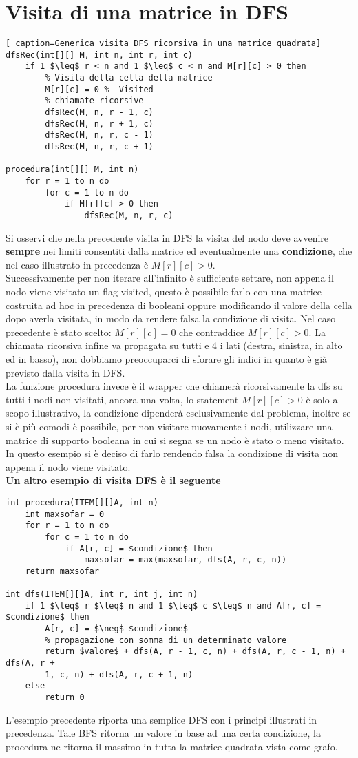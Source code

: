 \documentclass[../cheatSheetAlgoritmi.tex]{subfiles}
\begin{document}
\section{Visita di una matrice in DFS}
\begin{lstlisting}[ caption=Generica visita DFS ricorsiva in una matrice quadrata]
dfsRec(int[][] M, int n, int r, int c)
	if 1 $\leq$ r < n and 1 $\leq$ c < n and M[r][c] > 0 then
    	% Visita della cella della matrice
    	M[r][c] = 0	%  Visited
    	% chiamate ricorsive
    	dfsRec(M, n, r - 1, c)
    	dfsRec(M, n, r + 1, c)
    	dfsRec(M, n, r, c - 1)
    	dfsRec(M, n, r, c + 1)

procedura(int[][] M, int n)
	for r = 1 to n do
    	for c = 1 to n do
      		if M[r][c] > 0 then
        		dfsRec(M, n, r, c)
\end{lstlisting}
Si osservi che nella precedente visita in DFS la visita del nodo deve avvenire \textbf{sempre} nei limiti consentiti dalla matrice ed eventualmente una \textbf{condizione}, che nel caso illustrato in precedenza è $M[r][c] > 0$. \\
Successivamente per non iterare all'infinito è sufficiente settare, non appena il nodo viene visitato un flag visited, questo è possibile farlo con una matrice costruita ad hoc in precedenza di booleani oppure modificando il valore della cella dopo averla visitata, in modo da rendere falsa la condizione di visita. Nel caso precedente è stato scelto: $M[r][c] = 0$ che contraddice $M[r][c] > 0$. La chiamata ricorsiva infine va propagata su tutti e 4 i lati (destra, sinistra, in alto ed in basso), non dobbiamo preoccuparci di sforare gli indici in quanto è già previsto dalla visita in DFS.\\
La funzione procedura invece è il wrapper che chiamerà ricorsivamente la dfs su tutti i nodi non visitati, ancora una volta, lo statement $M[r][c] > 0$ è solo a scopo illustrativo, la condizione dipenderà esclusivamente dal problema, inoltre se si è più comodi è possibile, per non visitare nuovamente i nodi, utilizzare una matrice di supporto booleana in cui si segna se un nodo è stato o meno visitato. In questo esempio si è deciso di farlo rendendo falsa la condizione di visita non appena il nodo viene visitato.\\
\textbf{Un altro esempio di visita DFS è il seguente}
\begin{lstlisting}[caption=DFS generica con return di valore]
% esempio tenere il valore massimo
int procedura(ITEM[][]A, int n)
	int maxsofar = 0
  	for r = 1 to n do
    	for c = 1 to n do
      		if A[r, c] = $condizione$ then
       	 		maxsofar = max(maxsofar, dfs(A, r, c, n))
  	return maxsofar

int dfs(ITEM[][]A, int r, int j, int n)
	if 1 $\leq$ r $\leq$ n and 1 $\leq$ c $\leq$ n and A[r, c] = $condizione$ then
    	A[r, c] = $\neg$ $condizione$
    	% propagazione con somma di un determinato valore
    	return $valore$ + dfs(A, r - 1, c, n) + dfs(A, r, c - 1, n) + dfs(A, r +
  		1, c, n) + dfs(A, r, c + 1, n)
  	else
    	return 0
\end{lstlisting}
L'esempio precedente riporta una semplice DFS con i principi illustrati in precedenza. Tale BFS ritorna un valore in base ad una certa condizione, la procedura ne ritorna il massimo in tutta la matrice quadrata vista come grafo.
\newpage
\end{document}
